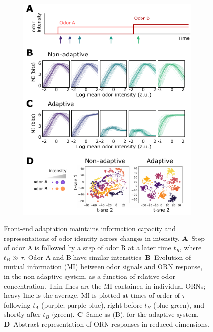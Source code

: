 \documentclass[9pt,twocolumn,twoside,lineno]{pnas-new}
\begin{document}
\begin{figure}[!tb]
	\centering
	\begin{subfigure}[t]{\linewidth}
		\includegraphics[width=\textwidth]{figures/2_coding_representation}
		\label{fig:coding_a}
	\end{subfigure}
	\begin{subfigure}[t]{0\linewidth}
		\label{fig:coding_b}
	\end{subfigure}
	\begin{subfigure}[t]{0\linewidth}
		\label{fig:coding_c}
	\end{subfigure}
	\begin{subfigure}[t]{0\linewidth}
		\label{fig:coding_3}
	\end{subfigure}
	\caption{\footnotesize{Front-end adaptation maintains information capacity and representations of odor identity across changes in intensity. 
		\textbf{A}~Step of odor A is followed by a step of odor B at a later time $t_B$, where $t_B \gg \tau$. Odor A and B have similar intensities.
    	\textbf{B}~Evolution of mutual information (MI) between odor signals and ORN response, in the non-adaptive system, as a function of relative odor concentration. Thin lines are the MI contained in individual ORNs; heavy line is the average. MI is plotted at times of order of $\tau$ following $t_A$ (purple; purple-blue), right before $t_B$ (blue-green), and shortly after $t_B$ (green).
		\textbf{C}~Same as (B), for the adaptive system.
		\textbf{D}~Abstract representation of ORN responses in reduced dimensions.
        }}
	\label{fig:coding}
\end{figure}
\end{document}

